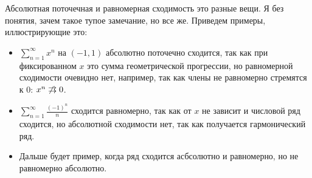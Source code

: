 \notice \; Абсолютная поточечная и равномерная сходимость это разные вещи.
Я без понятия, зачем такое тупое замечание, но все же.
Приведем примеры, иллюстрирующие это: \begin{itemize}
    \item $\sum\limits_{n = 1}^\infty x^n$ на $(-1, 1)$ абсолютно поточечно сходится, так как при фиксированном $x$ это сумма геометрической прогрессии, но равномерной сходимости очевидно нет, например, так как члены не равномерно стремятся к 0: $x^n \not \doublerightarrow 0$.
    \item $\sum\limits_{n = 1}^\infty \frac{(-1)^n}{n}$ сходится равномерно, так как от $x$ не зависит и числовой ряд сходится, но абсолютной сходимости нет, так как получается гармонический ряд.
    \item Дальше будет пример, когда ряд сходится асбсолютно и равномерно, но не равномерно абсолютно.
\end{itemize}

